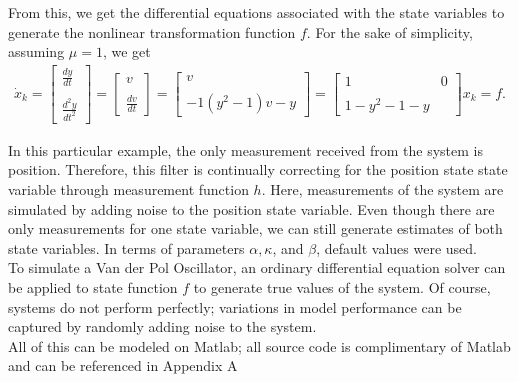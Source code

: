 \noindent From this, we get the differential equations associated with the state variables to generate the nonlinear transformation function $f$. For the sake of simplicity, assuming $\mu = 1$, we get
\begin{align*}
\dot x_k  = 
	\begin{bmatrix}
           \frac{dy}{dt}  \\ \\
           \frac{d^2y}{dt^2} 
           \end{bmatrix} = 
           \begin{bmatrix}
          v \\ \\
           \frac{dv}{dt} 
           \end{bmatrix}  =
           \begin{bmatrix}
           v \\ \\
           -1 (y^2 - 1)v - y 
           \end{bmatrix}=
           \begin{bmatrix}
           1 & 0 \\ \\
           1- y^2 - 1 - y 
           \end{bmatrix} x_k 
           =
           f.
\end{align*}


\noindent In this particular example, the only measurement received from the system is position. Therefore, this filter is continually correcting for the position state state variable through measurement function $h$. Here, measurements of the system are simulated by adding noise to the position state variable. Even though there are only measurements for one state variable, we can still generate estimates of both state variables. In terms of parameters $\alpha, \kappa$, and $\beta$, default values were used.\\ 

\noindent To simulate a Van der Pol Oscillator, an ordinary differential equation solver can be applied to state function $f$ to generate true values of the system. Of course, systems do not perform perfectly; variations in model performance can be captured by randomly adding noise to the system. \\

\noindent All of this can be modeled on Matlab; all source code is complimentary of Matlab and can be referenced in Appendix A \cite{matlab /& simulink}

